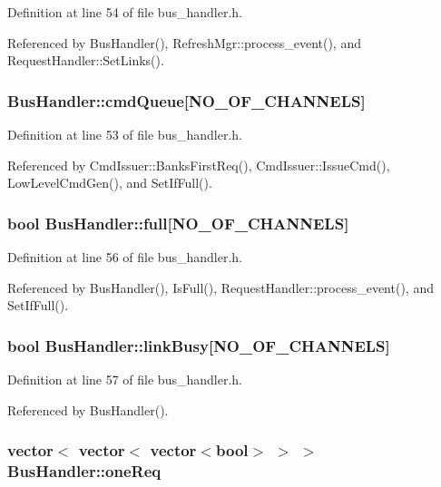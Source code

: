 Definition at line 54 of file bus\_\-handler.h.

Referenced by BusHandler(), RefreshMgr::process\_\-event(), and RequestHandler::SetLinks().
\subsubsection[{cmdQueue}]{ {\bf BusHandler::cmdQueue}[{\bf NO\_\-OF\_\-CHANNELS}]}\label{classBusHandler_a2fcdc7c7117ee34c79ca742dab2a595}




Definition at line 53 of file bus\_\-handler.h.

Referenced by CmdIssuer::BanksFirstReq(), CmdIssuer::IssueCmd(), LowLevelCmdGen(), and SetIfFull().
\subsubsection[{full}]{\setlength{\rightskip}{0pt plus 5cm}bool {\bf BusHandler::full}[{\bf NO\_\-OF\_\-CHANNELS}]}\label{classBusHandler_2fe96733417204a2a206c1f2522b3c5b}




Definition at line 56 of file bus\_\-handler.h.

Referenced by BusHandler(), IsFull(), RequestHandler::process\_\-event(), and SetIfFull().
\subsubsection[{linkBusy}]{\setlength{\rightskip}{0pt plus 5cm}bool {\bf BusHandler::linkBusy}[{\bf NO\_\-OF\_\-CHANNELS}]}\label{classBusHandler_24b8ef732b4bf23223bfcae98053f8ae}




Definition at line 57 of file bus\_\-handler.h.

Referenced by BusHandler().
\subsubsection[{oneReq}]{\setlength{\rightskip}{0pt plus 5cm}vector$<$ vector$<$ vector$<$bool$>$ $>$ $>$ {\bf BusHandler::oneReq}}\label{classBusHandler_4a132b59f5b4e15f316d3bb3409c6ff0}




